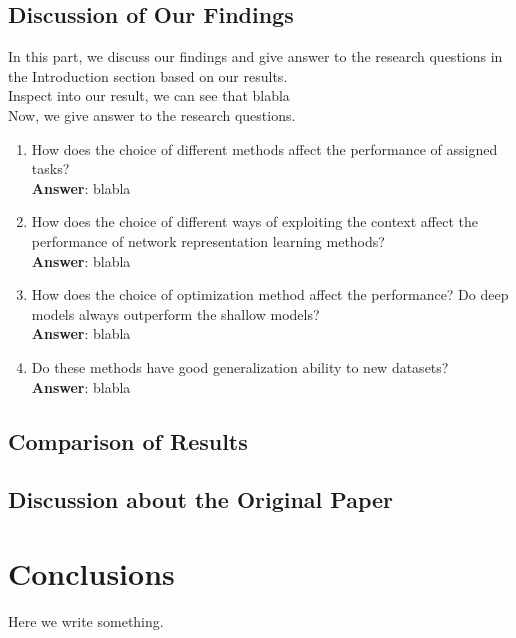 \documentclass[a4paper]{article}
\begin{document}
\subsection{Discussion of Our Findings}

\noindent In this part, we discuss our findings and give answer to the research questions in the Introduction section based on our results.\\

\noindent Inspect into our result, we can see that blabla \\

\noindent Now, we give answer to the research questions.
\begin{enumerate}[1.]
\item How does the choice of different methods affect the performance of assigned tasks? \\
\textbf{Answer}: blabla

\item How does the choice of different ways of exploiting the context affect the performance of network representation learning methods?\\
\textbf{Answer}: blabla

\item How does the choice of optimization method affect the performance? Do deep models always outperform the shallow models?\\
\textbf{Answer}: blabla

\item Do these methods have good generalization ability to new datasets?\\
\textbf{Answer}: blabla

\end{enumerate}

\subsection{Comparison of Results}


\subsection{Discussion about the Original Paper}



\section{Conclusions}

\noindent Here we write something. 



\printbibliography
\end{document}
